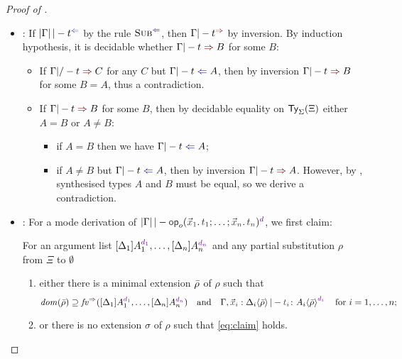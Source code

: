 \begin{proof}[Proof of {}]
\begin{itemize}
    \item {}: If $\erase{\Gamma} |-t^{\chk}$ by the rule $\ChkRule{Sub}$, then $\Gamma |- t^{\syn}$ by inversion.
      By induction hypothesis, it is decidable whether $\Gamma |- t \syn B$ for some $B$:
      \begin{itemize}
        \item If $\Gamma |/- t \syn C$ for any $C$ but $\Gamma |- t \chk A$, then by inversion $\Gamma |- t \syn B$ for some $B = A$, thus a contradiction.
        \item If $\Gamma |- t \syn B$ for some $B$, then by decidable equality on $\mathsf{Ty}_{\Sigma}(\Xi)$ either $A = B$ or $A \neq B$: 
          \begin{itemize}
            \item if $A = B$ then we have\/ $\Gamma |- t \chk A$;
            \item if $A \neq B$ but $\Gamma |- t \chk A$, then by inversion $\Gamma |- t \syn A$.
              However, by , synthesised types $A$ and $B$ must be equal, so we derive a contradiction.
          \end{itemize}
      \end{itemize}
    \item {}:
      For a mode derivation of $\erase{\Gamma} |- \tmOpts^{\dir{d}}$, we first claim:
      \begin{claim}\label{lem:args-induction}
        For an argument list $\biargs$ and any partial substitution $\rho$ from $\Xi$ to $\emptyset$
        \begin{enumerate}
          \item either there is a minimal extension $\bar{\rho}$ of $\rho$ such that 
            \begin{equation} \label{eq:claim}
              \dom(\ext{\rho}) \supseteq \synvar(\biargs)
              \quad\text{and}\quad
              \Gamma, \vars{x}_\isTerm{i} : \simsub{\Delta_i}{\ext{\rho}} |- \isTerm{t_i} \colon \simsub{A_i}{\ext{\rho}}^{\dir{d_i}}
              \quad\text{for $i = 1, \ldots, n$};
            \end{equation}
          \item or there is no extension $\sigma$ of $\rho$ such that \eqref{eq:claim} holds.
        \end{enumerate}
      \end{claim}


\end{itemize}
\end{proof}
